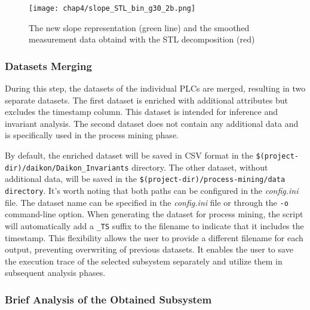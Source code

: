 \begin{figure}[ht]
	\centering
	\texttt{[image: chap4/slope\_STL\_bin\_g30\_2b.png]}
	\caption{The new slope representation (green line) and the smoothed measurement data obtaind with the STL decomposition (red)}
	\label{fig:4_slope_daikon}
\end{figure}

\subsubsection{Datasets Merging}
\label{subsubsec:4_dataset_merging}
During this step, the datasets of the individual PLCs are merged, resulting in two separate datasets. The first dataset is enriched with additional attributes but excludes the timestamp column. This dataset is intended for inference and invariant analysis. The second dataset does not contain any additional data and is specifically used in the process mining phase.

\bigskip
By default, the enriched dataset will be saved in CSV format in the \texttt{\$(project-dir)/daikon/Daikon\_Invariants} directory. The other dataset, without additional data, will be saved in the \texttt{\$(project-dir)/process-mining/data directory}. It's worth noting that both paths can be configured in the \textit{config.ini} file. The dataset name can be specified in the \textit{config.ini} file or through the \texttt{-o} command-line option. When generating the dataset for process mining, the script will automatically add a \texttt{\_TS} suffix to the filename to indicate that it includes the timestamp. This flexibility allows the user to provide a different filename for each output, preventing overwriting of previous datasets. It enables the user to save the execution trace of the selected subsystem separately and utilize them in subsequent analysis phases.

\subsubsection{Brief Analysis of the Obtained Subsystem}
\label{subsubsec:4_brief_analysis}

